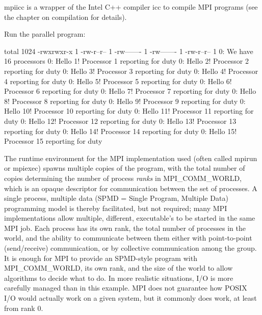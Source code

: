 mpiicc is a wrapper of the Intel C++ compiler icc to compile MPI programs (see
the chapter on compilation for details).

Run the parallel program:

\begin{prompt}
total 1024
-rwxrwxr-x 1 %
-rw-r--r-- 1 %
-rw------- 1 %
-rw------- 1 %
-rw-r--r-- 1 %
0: We have 16 processors
0: Hello 1! Processor 1 reporting for duty
0: Hello 2! Processor 2 reporting for duty
0: Hello 3! Processor 3 reporting for duty
0: Hello 4! Processor 4 reporting for duty
0: Hello 5! Processor 5 reporting for duty
0: Hello 6! Processor 6 reporting for duty
0: Hello 7! Processor 7 reporting for duty
0: Hello 8! Processor 8 reporting for duty
0: Hello 9! Processor 9 reporting for duty
0: Hello 10! Processor 10 reporting for duty
0: Hello 11! Processor 11 reporting for duty
0: Hello 12! Processor 12 reporting for duty
0: Hello 13! Processor 13 reporting for duty
0: Hello 14! Processor 14 reporting for duty
0: Hello 15! Processor 15 reporting for duty
\end{prompt}

The runtime environment for the MPI implementation used (often called mpirun or
mpiexec) spawns multiple copies of the program, with the total number of copies
determining the number of process \emph{ranks} in MPI\_COMM\_WORLD, which is
an opaque descriptor for communication between the set of processes. A single
process, multiple data (SPMD = Single Program, Multiple Data) programming model
is thereby facilitated, but not required; many MPI implementations allow
multiple, different, executable's to be started in the same MPI job. Each
process has its own rank, the total number of processes in the world, and the
ability to communicate between them either with point-to-point (send/receive)
communication, or by collective communication among the group. It is enough for
MPI to provide an SPMD-style program with MPI\_COMM\_WORLD, its own rank, and
the size of the world to allow algorithms to decide what to do. In more
realistic situations, I/O is more carefully managed than in this example. MPI
does not guarantee how POSIX I/O would actually work on a given system, but it
commonly does work, at least from rank 0.

